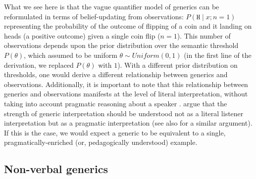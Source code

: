 \documentclass[10pt,letterpaper]{article}
\begin{document}
What we see here is that the vague quantifier model of generics can be reformulated in terms of belief-updating from observations: $P(\texttt{H} \mid x; n=1)$ representing the probability of the outcome of flipping of a coin and it landing on heads (a positive outcome) given a single coin flip ($n=1$). 
This number of observations depends upon the prior distribution over the semantic threshold $P(\theta)$, which  assumed to be uniform $\theta \sim Uniform(0,1)$ (in the first line of the derivation, we replaced $P(\theta)$ with $1$).
With a different prior distribution on thresholds, one would derive a different relationship between generics and observations.
Additionally, it is important to note that this relationship between generics and observations manifests at the level of literal interpretation, without taking into account pragmatic reasoning about a speaker \cite{grice1975logic}. %
 argue that the strength of generic interpretation should be understood not as a literal listener interpretation but as a pragmatic interpretation (see also  for a similar argument). 
If this is the case, we would expect a generic to be equivalent to a single, pragmatically-enriched (or, pedagogically understood) example. 

\subsection{Non-verbal generics}
\end{document}
